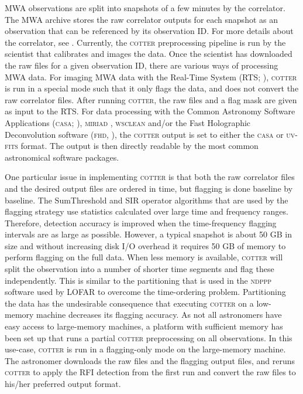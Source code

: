 \documentclass{pasa}
\begin{document}
MWA observations are split into snapshots of a few minutes by the correlator. The MWA archive stores the raw correlator outputs for each snapshot as an observation that can be referenced by its observation ID. For more details about the correlator, see \citet{ord-2014-mwa-fpga-gpu}. Currently, the \textsc{cotter} preprocessing pipeline is run by the scientist that calibrates and images the data. Once the scientist has downloaded the raw files for a given observation ID, there are various ways of processing MWA data. For imaging MWA data with the Real-Time System (RTS; \citealt{rts-mwa-2008}), \textsc{cotter} is run in a special mode such that it only flags the data, and does not convert the raw correlator files. After running \textsc{cotter}, the raw files and a flag mask are given as input to the RTS. For data processing with the Common Astronomy Software Applications (\textsc{casa}; \citealt{casa-2008}), \textsc{miriad} \citep{miriad-sault-1995}, \textsc{wsclean} \citep{offringa-wsclean-2014} and/or the Fast Holographic Deconvolution software (\textsc{fhd}, \citealt{fhd-sullivan-2012}), the \textsc{cotter} output is set to either the \textsc{casa} or \textsc{uv-fits} format. The output is then directly readable by the most common astronomical software packages. 

One particular issue in implementing \textsc{cotter} is that both the raw correlator files and the desired output files are ordered in time, but flagging is done baseline by baseline. The SumThreshold and SIR operator algorithms that are used by the flagging strategy use statistics calculated over large time and frequency ranges. Therefore, detection accuracy is improved when the time-frequency flagging intervals are as large as possible. However, a typical snapshot is about 50 GB in size and without increasing disk I/O overhead it requires 50 GB of memory to perform flagging on the full data. When less memory is available, \textsc{cotter} will split the observation into a number of shorter time segments and flag these independently. This is similar to the partitioning that is used in the \textsc{ndppp} software used by LOFAR \citep{lofar-imaging-cookbook} to overcome the time-ordering problem. Partitioning the data has the undesirable consequence that executing \textsc{cotter} on a low-memory machine decreases its flagging accuracy. As not all astronomers have easy access to large-memory machines, a platform with sufficient memory has been set up that runs a partial \textsc{cotter} preprocessing on all observations. In this use-case, \textsc{cotter} is run in a flagging-only mode on the large-memory machine. The astronomer downloads the raw files and the flagging output files, and reruns \textsc{cotter} to apply the RFI detection from the first run and convert the raw files to his/her preferred output format.
\end{document}
